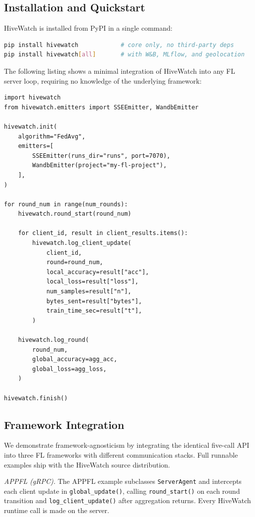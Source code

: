 
\subsection{Installation and Quickstart}

HiveWatch is installed from PyPI in a single command:

\begin{lstlisting}[style=PythonStyle,language=bash,caption={Installation.}]
pip install hivewatch            # core only, no third-party deps
pip install hivewatch[all]       # with W&B, MLflow, and geolocation
\end{lstlisting}

The following listing shows a minimal integration of HiveWatch into any FL server loop, requiring no knowledge of the underlying framework:

\begin{lstlisting}[style=PythonStyle,caption={Minimal HiveWatch integration.}]
import hivewatch
from hivewatch.emitters import SSEEmitter, WandbEmitter

hivewatch.init(
    algorithm="FedAvg",
    emitters=[
        SSEEmitter(runs_dir="runs", port=7070),
        WandbEmitter(project="my-fl-project"),
    ],
)

for round_num in range(num_rounds):
    hivewatch.round_start(round_num)

    for client_id, result in client_results.items():
        hivewatch.log_client_update(
            client_id,
            round=round_num,
            local_accuracy=result["acc"],
            local_loss=result["loss"],
            num_samples=result["n"],
            bytes_sent=result["bytes"],
            train_time_sec=result["t"],
        )

    hivewatch.log_round(
        round_num,
        global_accuracy=agg_acc,
        global_loss=agg_loss,
    )

hivewatch.finish()
\end{lstlisting}

\subsection{Framework Integration}

We demonstrate framework-agnosticism by integrating the identical five-call API into three FL frameworks with different communication stacks. Full runnable examples ship with the HiveWatch source distribution.

\textit{APPFL (gRPC).} The APPFL example subclasses \texttt{ServerAgent} and intercepts each client update in \texttt{global\_update()}, calling \texttt{round\_start()} on each round transition and \texttt{log\_client\_update()} after aggregation returns. Every HiveWatch runtime call is made on the server.

